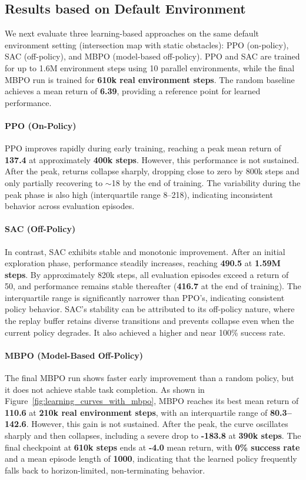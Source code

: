 \subsection{Results based on Default Environment}

We next evaluate three learning-based approaches on the same default environment setting (intersection map with static obstacles): PPO (on-policy), SAC (off-policy), and MBPO (model-based off-policy). PPO and SAC are trained for up to 1.6M environment steps using 10 parallel environments, while the final MBPO run is trained for \textbf{610k real environment steps}. The random baseline achieves a mean return of \textbf{6.39}, providing a reference point for learned performance.

\paragraph{PPO (On-Policy)}
PPO improves rapidly during early training, reaching a peak mean return of \textbf{137.4} at approximately \textbf{400k steps}. However, this performance is not sustained. After the peak, returns collapse sharply, dropping close to zero by 800k steps and only partially recovering to $\sim$18 by the end of training. The variability during the peak phase is also high (interquartile range 8--218), indicating inconsistent behavior across evaluation episodes.

\paragraph{SAC (Off-Policy)}
In contrast, SAC exhibits stable and monotonic improvement. After an initial exploration phase, performance steadily increases, reaching \textbf{490.5} at \textbf{1.59M steps}. By approximately 820k steps, all evaluation episodes exceed a return of 50, and performance remains stable thereafter (\textbf{416.7} at the end of training). The interquartile range is significantly narrower than PPO's, indicating consistent policy behavior. SAC's stability can be attributed to its off-policy nature, where the replay buffer retains diverse transitions and prevents collapse even when the current policy degrades. It also achieved a higher and near 100\% success rate.

\paragraph{MBPO (Model-Based Off-Policy)}
The final MBPO run shows faster early improvement than a random policy, but it does not achieve stable task completion. As shown in Figure~\ref{fig:learning_curves_with_mbpo}, MBPO reaches its best mean return of \textbf{110.6} at \textbf{210k real environment steps}, with an interquartile range of \textbf{80.3--142.6}. However, this gain is not sustained. After the peak, the curve oscillates sharply and then collapses, including a severe drop to \textbf{-183.8} at \textbf{390k steps}. The final checkpoint at \textbf{610k steps} ends at \textbf{-4.0} mean return, with \textbf{0\% success rate} and a mean episode length of \textbf{1000}, indicating that the learned policy frequently falls back to horizon-limited, non-terminating behavior.

